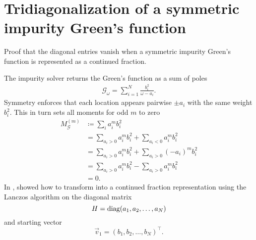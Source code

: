 \chapter{Tridiagonalization of a symmetric impurity Green's function}

Proof that the diagonal entries vanish when a symmetric impurity Green's function
is represented as a continued fraction.

The impurity solver returns the Green's function as a sum of poles
\begin{align}
    \mathcal{G}_{\!\omega} = \sum_{i=1}^N \frac{b_i^2}{\omega - a_i}.
    \label{eq:impurity-greens-function}
\end{align}
Symmetry enforces that each location appears pairwise $\pm a_i$
with the same weight $b_i^2$.
This in turn sets all moments for odd $m$ to zero
\begin{align}
    M^{(m)}_{\mathcal{G}}
     & \coloneqq
    \sum_i a_i^m b_i^2                                     \\
     & =
    \sum_{a_i>0} a_i^m b_i^2 + \sum_{a_i<0} a_i^m b_i^2    \\
     & =
    \sum_{a_i>0} a_i^m b_i^2 + \sum_{a_i>0} (-a_i)^m b_i^2 \\
     & =
    \sum_{a_i>0} a_i^m b_i^2 - \sum_{a_i>0} a_i^m b_i^2    \\
     & =
    0.
\end{align}
In \cite[appendix B]{Lu2014}, \citeauthor{Lu2014} showed how to transform
 into a continued fraction representation
using the Lanczos algorithm on the diagonal matrix
\begin{equation}
    H
    =
    \operatorname{diag}(a_1, a_2, \ldots, a_N)
\end{equation}
and starting vector
\begin{equation}
    \vec{v}_1 = (b_1, b_2, \ldots, b_N)^\intercal.
\end{equation}


